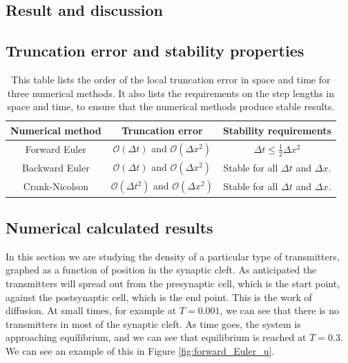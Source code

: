 \documentclass[12pt]{article}
\begin{document}
\begin{flushleft}
\section{Result and discussion}
\subsection{Truncation error and stability properties}

\begin{table}[!h]
\begin{center}
\begin{tabular}{| c | c | c |}
	\hline
	\textbf{Numerical method} & \textbf{Truncation error} & \textbf{Stability requirements}\\
	\hline	
	Forward Euler & $\mathcal{O}(\Delta t)$ and $\mathcal{O}(\Delta x^2)$ & $\Delta t \leq \frac{1}{2}\Delta x^2$ \\
		Backward Euler & $\mathcal{O}(\Delta t)$ and $\mathcal{O}(\Delta x^2)$ & Stable for all $\Delta t$ and $\Delta x$.\\
			Crank-Nicolson & $\mathcal{O}(\Delta t^2)$ and $\mathcal{O}(\Delta x^2)$ & Stable for all $\Delta t$ and $\Delta x$.\\
  \hline
\end{tabular}
\end{center}
\caption{\label{tab:error_stability}This table lists the order of the local truncation error in space and time for three numerical methods. It also lists the requirements on the step lengths in space and time, to ensure that the numerical methods produce stable results.}
\end{table}

\subsection{Numerical calculated results\label{sect:numerical_results}}
In this section we are studying the density of a particular type of transmitters, graphed as a function of position in the synaptic cleft. As anticipated the transmitters will spread out from the presynaptic cell, which is the start point, against the postsynaptic cell, which is the end point. This is the work of diffusion. At small times, for example at $T = 0.001$, we can see that there is no transmitters in most of the synaptic cleft. As time goes, the system is approaching equilibrium, and we can see that equilibrium is reached at $T = 0.3$. We can see an example of this in Figure \ref{fig:forward_Euler_u}.


\end{flushleft}
\end{document}
